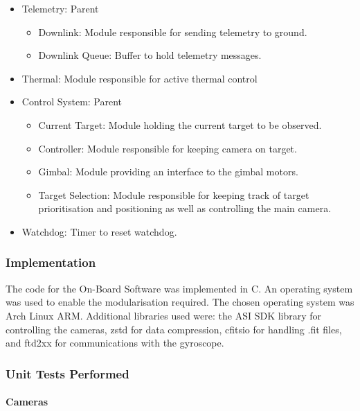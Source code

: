 \begin{itemize}
    \item Telemetry: Parent
        \begin{itemize}
            \item Downlink: Module responsible for sending telemetry to ground.
            \item Downlink Queue: Buffer to hold telemetry messages.
        \end{itemize}

    \item Thermal: Module responsible for active thermal control

    \item Control System: Parent
        \begin{itemize}
            \item Current Target: Module holding the current target to be observed.
            \item Controller: Module responsible for keeping camera on target.
            \item Gimbal: Module providing an interface to the gimbal motors.
            \item Target Selection: Module responsible for keeping track of target prioritisation and positioning as well as controlling the main camera.
        \end{itemize}

    \item Watchdog: Timer to reset watchdog.

\end{itemize}

\subsubsection{Implementation}

The code for the On-Board Software was implemented in C. An operating system was used to enable the modularisation required. The chosen operating system was Arch Linux ARM. Additional libraries used were: the ASI SDK library for controlling the cameras, zstd for data compression, cfitsio for handling .fit files, and ftd2xx for communications with the gyroscope.

\subsubsection{Unit Tests Performed}

\paragraph{Cameras}

